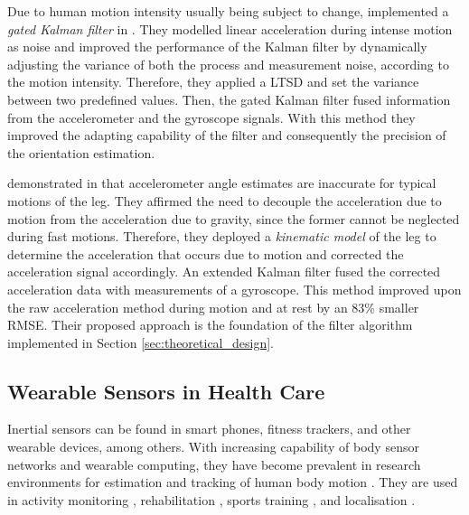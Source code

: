 Due to human motion intensity usually being subject to change, \citeauthor{olivares_vicente_signal_2013} implemented a \emph{gated Kalman filter} in \cite{olivares_vicente_signal_2013}. They modelled linear acceleration during intense motion as noise and improved the performance of the Kalman filter by dynamically adjusting the variance of both the process and measurement noise, according to the motion intensity. Therefore, they applied a \gls{LTSD} and set the variance between two predefined values. Then, the gated Kalman filter fused information from the accelerometer and the gyroscope signals. With this method they improved the adapting capability of the filter and consequently the precision of the orientation estimation.

\citeauthor{bennett_motion_2014} demonstrated in \cite{bennett_motion_2014} that accelerometer angle estimates are inaccurate for typical motions of the leg. They affirmed the need to decouple the acceleration due to motion from the acceleration due to gravity, since the former cannot be neglected during fast motions. Therefore, they deployed a \emph{kinematic model} of the leg to determine the acceleration that occurs due to motion and corrected the acceleration signal accordingly. An extended Kalman filter fused the corrected acceleration data with measurements of a gyroscope. This method improved upon the raw acceleration method during motion and at rest by an 83\% smaller \gls{RMSE}. Their proposed approach is the foundation of the filter algorithm implemented in Section \ref{sec:theoretical_design}.

\subsection{Wearable Sensors in Health Care}\label{sec:MARG_sensors_medical}

Inertial sensors can be found in smart phones, fitness trackers, and other wearable devices, among others. With increasing capability of body sensor networks and wearable computing, they have become prevalent in research environments for estimation and tracking of human body motion \cite{bennett_motion_2014}. They are used in activity monitoring \cite{veltink_detection_96, najafi_ambulatory_03, ermes_sports_08}, rehabilitation \cite{giggins_rehabilitation_13, lupinski_ligament_11}, sports training \cite{bonnet_squat_13, ermes_sports_08}, and localisation \cite{hoflinger_localization_13, Bennett_distance_13}.


